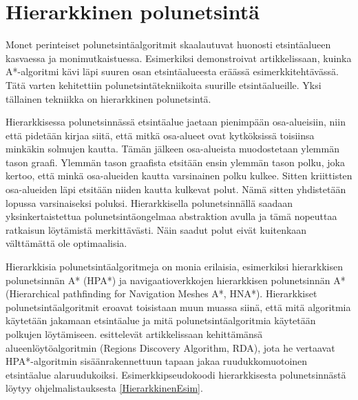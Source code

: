 \section{Hierarkkinen polunetsintä}\label{hpa}
Monet perinteiset polunetsintäalgoritmit skaalautuvat huonosti etsintäalueen 
kasvaessa ja monimutkaistuessa. Esimerkiksi \textcite{rda} demonstroivat 
artikkelissaan, kuinka A*-algoritmi kävi läpi suuren osan etsintäalueesta 
eräässä esimerkkitehtävässä. Tätä varten kehitettiin polunetsintätekniikoita 
suurille etsintäalueille. Yksi tällainen tekniikka on hierarkkinen 
polunetsintä.\cite{rda} \par
	Hierarkkisessa polunetsinnässä etsintäalue jaetaan pienimpään 
osa-alueisiin, niin että pidetään kirjaa siitä, että mitkä osa-alueet ovat 
kytköksissä toisiinsa minkäkin solmujen kautta. Tämän jälkeen 
osa-alueista muodostetaan ylemmän tason graafi.\cite{rda} Ylemmän tason 
graafista etsitään ensin ylemmän tason polku, joka kertoo, että minkä 
osa-alueiden kautta varsinainen polku kulkee. Sitten kriittisten osa-alueiden 
läpi etsitään niiden kautta kulkevat polut. Nämä sitten yhdistetään lopussa 
varsinaiseksi poluksi. Hierarkkisella polunetsinnällä saadaan 
yksinkertaistettua polunetsintäongelmaa abstraktion avulla ja tämä nopeuttaa 
ratkaisun löytämistä merkittävästi. Näin saadut polut eivät kuitenkaan 
välttämättä ole optimaalisia.\cite{rda} \par
	Hierarkkisia polunetsintäalgoritmeja on monia erilaisia, esimerkiksi 
hierarkkisen polunetsinnän A* (HPA*) ja navigaatioverkkojen hierarkkisen 
polunetsinnän A* (Hierarchical pathfinding for Navigation Meshes A*, 
HNA*).\cite{rda} Hierarkkiset polunetsintäalgoritmit eroavat toisistaan muun 
muassa siinä, että mitä algoritmia käytetään jakamaan etsintäalue ja mitä 
polunetsintäalgoritmia käytetään polkujen löytämiseen. \textcite{rda} 
esittelevät artikkelissaan kehittämänsä alueenlöytöalgoritmin (Regions 
Discovery Algorithm, RDA), jota he vertaavat HPA*-algoritmin 
sisäänrakennettuun tapaan jakaa ruudukkomuotoinen etsintäalue alaruudukoiksi. 
Esimerkkipseudokoodi hierarkkisesta polunetsinnästä löytyy ohjelmalistauksesta 
\ref{HierarkkinenEsim}.
